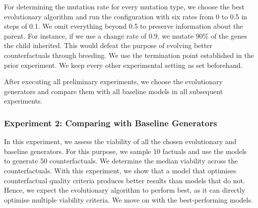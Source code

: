 \documentclass[./../../paper.tex]{subfiles}
\begin{document}

For determining the mutation rate for every mutation type, we choose the best evolutionary algorithm and run the configuration with six rates from 0 to 0.5 in steps of 0.1. We omit everything beyond 0.5 to preserve information about the parent. For instance, if we use a change rate of 0.9, we mutate 90\% of the genes the child inherited. This would defeat the purpose of evolving better counterfactuals through breeding. We use the termination point established in the prior experiment. We keep every other experimental setting as set beforehand. 

After executing all preliminary experiments, we choose the evolutionary generators and compare them with all baseline models in all subsequent experiments.






\subsubsection{Experiment 2: Comparing with Baseline Generators}
In this experiment, we assess the viability of all the chosen evolutionary and baseline generators. For this purpose, we sample 10 factuals and use the models to generate 50 counterfactuals. We determine the median viability across the counterfactuals. With this experiment, we show that a model that optimises counterfactual quality criteria produces better results than models that do not. Hence, we expect the evolutionary algorithm to perform best, as it can directly optimise multiple viability criteria. We move on with the best-performing models.


\end{document}
